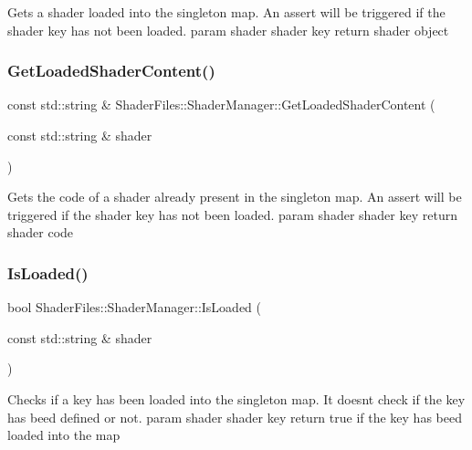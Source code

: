 Gets a shader loaded into the singleton map. An assert will be triggered if the shader key has not been loaded. param shader shader key return shader object \mbox{\label{class_shader_files_1_1_shader_manager_a82aa01b675a8ef29aa1283f86574166e}} 
\subsubsection{\texorpdfstring{GetLoadedShaderContent()}{GetLoadedShaderContent()}}
{\footnotesize\ttfamily const std\+::string \& Shader\+Files\+::\+Shader\+Manager\+::\+Get\+Loaded\+Shader\+Content (\begin{DoxyParamCaption}\item[{const std\+::string \&}]{shader }\end{DoxyParamCaption})}

Gets the code of a shader already present in the singleton map. An assert will be triggered if the shader key has not been loaded. param shader shader key return shader code \mbox{\label{class_shader_files_1_1_shader_manager_a4f0f22c76362af7b485116517a38415f}} 
\subsubsection{\texorpdfstring{IsLoaded()}{IsLoaded()}}
{\footnotesize\ttfamily bool Shader\+Files\+::\+Shader\+Manager\+::\+Is\+Loaded (\begin{DoxyParamCaption}\item[{const std\+::string \&}]{shader }\end{DoxyParamCaption})}

Checks if a key has been loaded into the singleton map. It doesn\textquotesingle{}t check if the key has beed defined or not. param shader shader key return true if the key has beed loaded into the map \mbox{\label{class_shader_files_1_1_shader_manager_abcee9b4822ed9c362c0266d61ed99be6}} 
